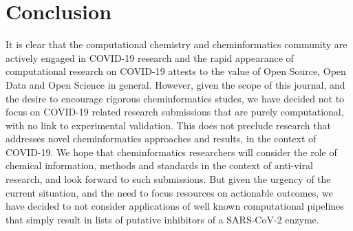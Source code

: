 \documentclass{bmcart}
\begin{document}
\section*{Conclusion}

It is clear that the computational chemistry and cheminformatics
community are actively engaged in COVID-19 research and the rapid
appearance of computational research \cite{jcim_covid_editorial} on
COVID-19 attests to the value of Open Source, Open Data and Open
Science in general. However, given the scope of this journal, and the
desire to encourage rigorous cheminformatics studes, we have decided
not to focus on COVID-19 related research submissions that are purely
computational, with no link to experimental validation. This does not
preclude research that addresses novel cheminformatics approaches and
results, in the context of COVID-19. We hope that cheminformatics
researchers will consider the role of chemical information, methods
and standards in the context of anti-viral research, and look forward
to such submissions. But given the urgency of the current situation,
and the need to focus resources on actionable outcomes, we have
decided to not consider applications of well known computational
pipelines that simply result in lists of putative inhibitors of a
SARS-CoV-2 enzyme.
\end{document}
